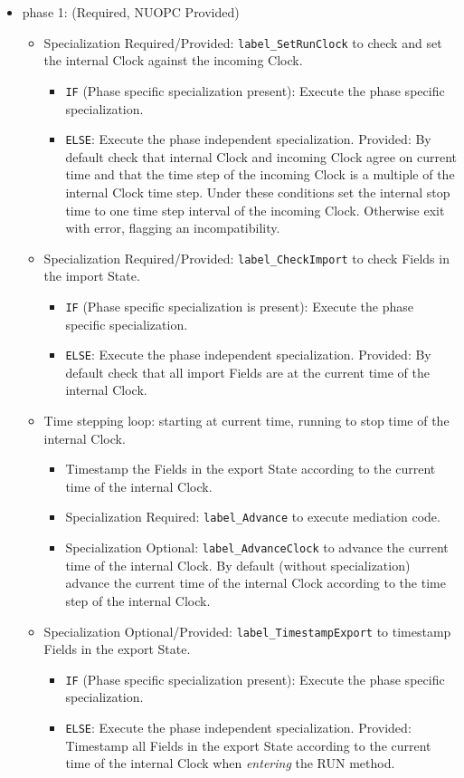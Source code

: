 \begin{itemize}
\item phase 1: ({\sc Required, NUOPC Provided})
  \begin{itemize}
  \item {\sc Specialization Required/Provided}: {\tt label\_SetRunClock} to check and set the internal Clock against the incoming Clock.
  \begin{itemize}
  \item {\tt IF} (Phase specific specialization present): Execute the phase specific specialization.
  \item {\tt ELSE}: Execute the phase independent specialization. {\sc Provided}: By default check that internal Clock and incoming Clock agree on current time and that the time step of the incoming Clock is a multiple of the internal Clock time step. Under these conditions set the internal stop time to one time step interval of the incoming Clock. Otherwise exit with error, flagging an incompatibility.
  \end{itemize}
  \item {\sc Specialization Required/Provided}: {\tt label\_CheckImport} to check Fields in the import State.
  \begin{itemize}
  \item {\tt IF} (Phase specific specialization is present): Execute the phase specific specialization.
  \item {\tt ELSE}: Execute the phase independent specialization. {\sc Provided}: By default check that all import Fields are at the current time of the internal Clock.
  \end{itemize}
  \item Time stepping loop: starting at current time, running to stop time of the internal Clock.
  \begin{itemize}
  \item Timestamp the Fields in the export State according to the current time of the internal Clock.
  \item {\sc Specialization Required}: {\tt label\_Advance} to execute mediation code.
  \item {\sc Specialization Optional}: {\tt label\_AdvanceClock} to advance the current time of the internal Clock. By default (without specialization) advance the current time of the internal Clock according to the time step of the internal Clock.
  \end{itemize}
  \item {\sc Specialization Optional/Provided}: {\tt label\_TimestampExport} to timestamp Fields in the export State.
  \begin{itemize}
  \item {\tt IF} (Phase specific specialization present): Execute the phase specific specialization.
  \item {\tt ELSE}: Execute the phase independent specialization. {\sc Provided}: Timestamp all Fields in the export State according to the current time of the internal Clock when {\em entering} the RUN method.
  \end{itemize}
  \end{itemize}    
\end{itemize}

